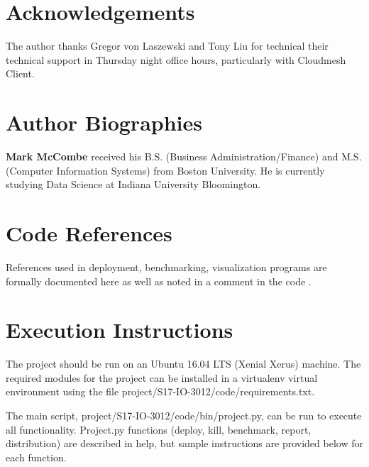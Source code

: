 \documentclass[9pt,twocolumn,twoside]{../../styles/osajnl}
\begin{document}
\section*{Acknowledgements}

The author thanks Gregor von Laszewski and Tony Liu for technical their technical support in Thursday night office hours, particularly with Cloudmesh Client.




 
\section*{Author Biographies}
\begingroup
\setlength\intextsep{0pt}
\begin{minipage}[t][3.2cm][t]{1.0\columnwidth} %
  \noindent
{\bfseries Mark McCombe} received his B.S. (Business Administration/Finance) and M.S. (Computer Information Systems) from Boston University.  He is currently studying Data Science at Indiana University Bloomington.

\end{minipage}
\endgroup

\newpage

\appendix

\section{Code References}
References used in deployment, benchmarking, visualization programs are formally documented here as well as noted in a comment in the code \cite{www-bashNum} \cite{www-lastChar} \cite{www-configOpts} \cite{www-bashArgs} \cite{www-cmVms}  \cite{www-python1}  \cite{www-python2}  \cite{www-python3} \cite{www-ansibleDir} \cite{www-mongoAnsible} \cite{www-ansibleCopy} \cite{www-ansibleHost} \cite{www-installMongo}.

\section{Execution Instructions}

The project should be run on an Ubuntu 16.04 LTS (Xenial Xerus) machine.  The required modules for the project can be installed in a virtualenv virtual environment using the file project/S17-IO-3012/code/requirements.txt.

The main script, project/S17-IO-3012/code/bin/project.py, can be run to execute all functionality.  Project.py functions (deploy, kill, benchmark, report, distribution) are described in help, but sample instructions are provided below for each function.
\end{document}
